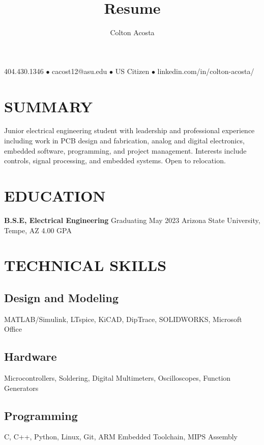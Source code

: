 \documentclass{article}
\makeatletter
\renewcommand{\maketitle}{
	\begin{center}
		{\huge\bfseries
			\theauthor}
			
		404.430.1346 $\bullet$ cacost12@asu.edu $\bullet$ US Citizen $\bullet$ linkedin.com/in/colton-acosta/
	\end{center}
}
\makeatother
\begin{document}
\title{Resume}
\author{Colton Acosta}
\maketitle
\section{SUMMARY}
Junior electrical engineering student with leadership and professional experience including work in PCB design and fabrication, analog and digital electronics, embedded software, programming, and project management. Interests include controls, signal processing, and embedded systems. Open to relocation.
\section{EDUCATION}
\textbf{B.S.E, Electrical Engineering}
\hfill 
Graduating May 2023
\linebreak
Arizona State University, Tempe, AZ 
\hfill
4.00 GPA

\section{TECHNICAL SKILLS}
\subsection{Design and Modeling}
MATLAB/Simulink, LTspice, KiCAD, DipTrace, SOLIDWORKS, Microsoft Office
\subsection{Hardware}
Microcontrollers, Soldering, Digital Multimeters, Oscilloscopes, Function Generators
\subsection{Programming} 
C, C++, Python, Linux, Git, ARM Embedded Toolchain, MIPS Assembly
\end{document}
